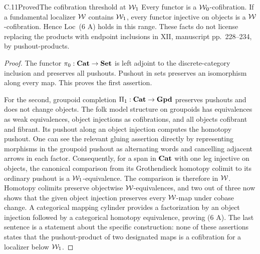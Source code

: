 \begin{claim}{C.11}{Proved}{The cofibration threshold at $\mathcal{W}_1$}
Every functor is a $\mathcal{W}_0$-cofibration. If a fundamental localizer
$\mathcal{W}$ contains $\mathcal{W}_1$, every functor injective on objects is a
$\mathcal{W}$-cofibration. Hence Loc~(6 A) holds in this range. These facts
do not license replacing the products with endpoint inclusions
in XII, manuscript pp.~228--234, by pushout-products.
\end{claim}
\begin{proof}
The functor $\pi_0:\mathbf{Cat}\to\mathbf{Set}$ is left adjoint to the
discrete-category inclusion and preserves all pushouts. Pushout
in sets preserves an isomorphism along every map. This proves
the first assertion.

For the second, groupoid completion $\Pi_1:\mathbf{Cat}\to\mathbf{Gpd}$
preserves pushouts and does not change objects. The folk model
structure on groupoids has equivalences as weak equivalences,
object injections as cofibrations, and all objects cofibrant and
fibrant. Its pushout along an object injection computes the
homotopy pushout. One can see the relevant gluing assertion
directly by representing morphisms in the groupoid pushout as
alternating words and cancelling adjacent arrows in each
factor. Consequently, for a span in $\mathbf{Cat}$ with one leg
injective on objects, the canonical comparison from its
Grothendieck homotopy colimit to its ordinary pushout is a
$\mathcal{W}_1$-equivalence. The comparison is therefore in $\mathcal{W}$.
Homotopy colimits preserve objectwise $\mathcal{W}$-equivalences, and
two out of three now shows that the given object injection
preserves every $\mathcal{W}$-map under cobase change. A categorical
mapping cylinder provides a factorization by an object
injection followed by a categorical homotopy equivalence,
proving (6 A). The last sentence is a statement about the
specific construction: none of these assertions states that
the pushout-product of two designated maps is a cofibration
for a localizer below $\mathcal{W}_1$.
\end{proof}

